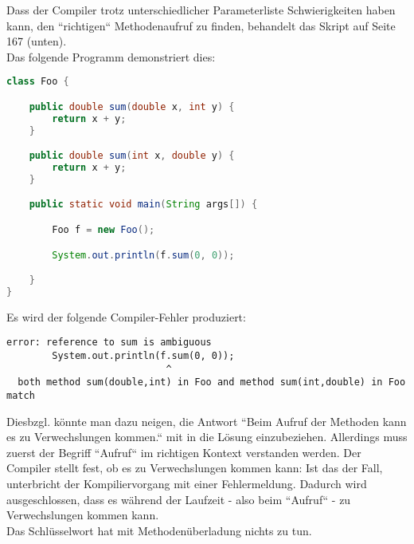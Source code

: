 Dass der Compiler trotz unterschiedlicher Parameterliste Schwierigkeiten haben kann, den ``richtigen`` Methodenaufruf zu finden,
behandelt das Skript auf Seite 167 (unten).\\

Das folgende Programm demonstriert dies:

\begin{lstlisting}[language=java]
class Foo {

    public double sum(double x, int y) {
        return x + y;
    }

    public double sum(int x, double y) {
        return x + y;
    }

    public static void main(String args[]) {

        Foo f = new Foo();

        System.out.println(f.sum(0, 0));

    }
}
\end{lstlisting}

Es wird der folgende Compiler-Fehler produziert:

\begin{lstlisting}[language=text]
error: reference to sum is ambiguous
        System.out.println(f.sum(0, 0));
                            ^
  both method sum(double,int) in Foo and method sum(int,double) in Foo match
\end{lstlisting}


Diesbzgl. könnte man dazu neigen, die Antwort ``Beim Aufruf der Methoden kann es zu Verwechslungen kommen.`` mit in
die Lösung einzubeziehen.
Allerdings muss zuerst der Begriff ``Aufruf`` im richtigen Kontext verstanden werden. Der Compiler stellt
fest, ob es zu Verwechslungen kommen kann: Ist das der Fall, unterbricht der Kompiliervorgang mit einer Fehlermeldung.
Dadurch wird ausgeschlossen, dass es während der Laufzeit - also beim ``Aufruf`` - zu Verwechslungen kommen kann.\\

Das Schlüsselwort  hat mit Methodenüberladung nichts zu tun.